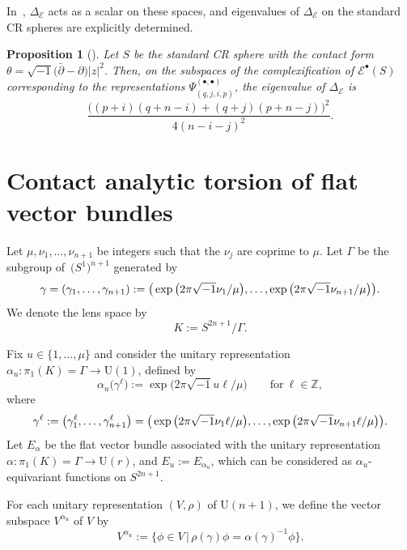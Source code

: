 \documentclass[pdftex]{sigma}
\numberwithin{equation}{section}
\newtheorem{Proposition}[Theorem]{Proposition}
 { \theoremstyle{definition}
\newtheorem{Definition}[Theorem]{Definition}
\newtheorem{Note}[Theorem]{Note}
\newtheorem{Example}[Theorem]{Example}
\newtheorem{Remark}[Theorem]{Remark} }
\newcommand{\ii}{\sqrt{-1}}
\newcommand{\RN}{\cE}
\newcommand{\cE}{\mathcal{E}}
\begin{document}
In~\cite{Kitaoka-19},
$\Delta_{\cE}$ acts as a scalar on these spaces,
and
eigenvalues of $\Delta_\RN $
on the standard CR spheres are explicitly determined.
\begin{Proposition}[{\cite[Theorem 0.1]{Kitaoka-19}}]
\label{prop:all eigenvalues of the Rumin Laplacian on sphere}
Let $S$ be the standard CR sphere with the contact form $\theta = \sqrt{-1} \big(\bar{\partial} - \partial\big) |z|^2$.
Then, on the subspaces of the complexification of $\cE ^\bullet (S)$
corresponding to the representations
$\Psi_{(q,j,i,p)}^{(\bullet , \bullet )}$,
the eigenvalue of $\Delta_\RN $ is
\[
\frac{\big( ( p +i )(q +n -i) + ( q +j )(p +n -j) \big)^2}{4 (n-i-j)^2 } .
\]
\end{Proposition}


\section{Contact analytic torsion of flat vector bundles}
\label{sec:on_flat_vector_bundles}

Let $\mu , \nu_1 , \ldots , \nu_{n+1}$ be integers such that the $\nu_j$ are coprime to $\mu$.
Let $\Gamma$ be the subgroup of~$\big(S^1\big)^{n+1}$ generated by
\begin{equation}
 \gamma
 = ( \gamma_1 , \ldots , \gamma_{n+1} )
 := \big( \exp \big( 2 \pi \ii \nu_1 / \mu \big), \dots , \exp \big( 2 \pi \ii \nu_{n+1} / \mu \big) \big) .
 \notag
\end{equation}
We denote the lens space by
\[
 K
 :=
 S^{2n+1} / \Gamma
 .
\]


Fix $u \in \{ 1, \ldots , \mu \}$ and consider the unitary representation $\alpha_u \colon \pi_1 (K) = \Gamma \to \mathrm{U} (1)$, defined by
\[
 \alpha_u \big( \gamma^{\ell} \big) := \exp \big( 2 \pi \ii u \ell / \mu \big)
 \qquad \text{for} \ \ell \in \mathbb{Z}
 ,
\]
where
\begin{equation}
 \gamma^{\ell}
 := \big( \gamma_1^{\ell} , \ldots , \gamma_{n+1}^{\ell} \big)
 = \big( \exp \big( 2 \pi \ii \nu_1 \ell / \mu \big), \dots , \exp \big( 2 \pi \ii \nu_{n+1} \ell / \mu \big) \big) .
 \notag
\end{equation}
Let $E_{\alpha}$ be the flat vector bundle associated with the unitary representation ${\alpha \colon \pi_1 (K) = \Gamma \! \to \! \mathrm{U} (r)}$, and $E_{u} := E_{\alpha_u}$, which can be considered as $\alpha_u$-equivariant functions on $S^{2n+1}$.


For each unitary representation $(V , \rho )$ of $\mathrm{U}(n+1)$, we define the vector subspace $V^{\alpha_u}$ of $V$ by
\[
V^{\alpha_u} := \big\{ \phi \in V \, \big| \, \rho ( \gamma ) \phi = \alpha ( \gamma )^{-1} \phi \big\}
.
\]
\end{document}
